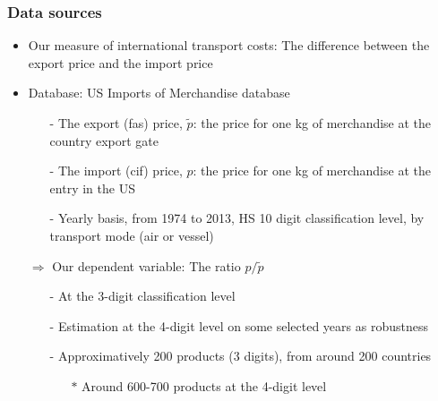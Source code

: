 \documentclass[10 pt,Helvetica, french]{beamer}
\begin{document}
\begin{frame} [label=slide_data]
\frametitle{Data sources}
\begin{itemize}
\item Our measure of international transport costs: The difference between the export price and the import price \vspace{0.1cm}
\item Database: US Imports of Merchandise database \hyperlink{app_data}{}\vspace{0.1cm}
\begin{itemize}
\item[-] The export (fas) price, $\widetilde{p}$: the price for one kg of merchandise at the country export gate \vspace{0.1cm}
\item[-] The import (cif) price, $p$: the price for one kg of merchandise at the entry in the US \vspace{0.1cm}
\item[-] Yearly basis, from 1974 to 2013, HS 10 digit classification level, by transport mode (air or vessel) \vspace{0.1cm}
\end{itemize}
\item[$\Rightarrow$] Our dependent variable: The ratio $p/\widetilde{p}$ \vspace{0.1cm}
\begin{itemize}
\item[-] At the 3-digit classification level  \vspace{0.1cm}
\item[-] Estimation at the 4-digit level on some selected years as robustness \vspace{0.1cm}
\item[-] Approximatively 200 products (3 digits), from around 200 countries  \vspace{0.1cm}
\begin{itemize}
\item[$\ast$] Around 600-700 products at the 4-digit level
\end{itemize}
\end{itemize}
\end{itemize}
\end{frame}
\end{document}
